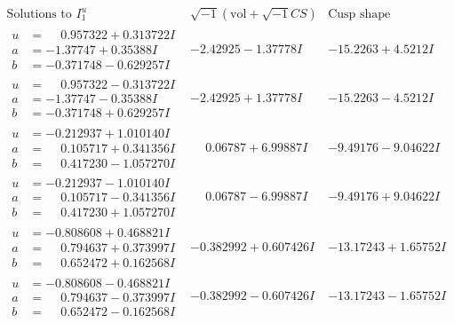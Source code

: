 \documentclass[1p]{elsarticle_modified}
\theoremstyle{definition}
\newcommand{\I}{\sqrt{-1}}
\begin{document}
$$\begin{array}{c|c|c}  
\text{Solutions to }I^u_{1}& \I (\text{vol} + \sqrt{-1}CS) & \text{Cusp shape}\\
 \hline 
\begin{aligned}
u &= \phantom{-}0.957322 + 0.313722 I \\
a &= -1.37747 + 0.35388 I \\
b &= -0.371748 - 0.629257 I\end{aligned}
 & -2.42925 - 1.37778 I & -15.2263 + 4.5212 I \\ \hline\begin{aligned}
u &= \phantom{-}0.957322 - 0.313722 I \\
a &= -1.37747 - 0.35388 I \\
b &= -0.371748 + 0.629257 I\end{aligned}
 & -2.42925 + 1.37778 I & -15.2263 - 4.5212 I \\ \hline\begin{aligned}
u &= -0.212937 + 1.010140 I \\
a &= \phantom{-}0.105717 + 0.341356 I \\
b &= \phantom{-}0.417230 - 1.057270 I\end{aligned}
 & \phantom{-}0.06787 + 6.99887 I & -9.49176 - 9.04622 I \\ \hline\begin{aligned}
u &= -0.212937 - 1.010140 I \\
a &= \phantom{-}0.105717 - 0.341356 I \\
b &= \phantom{-}0.417230 + 1.057270 I\end{aligned}
 & \phantom{-}0.06787 - 6.99887 I & -9.49176 + 9.04622 I \\ \hline\begin{aligned}
u &= -0.808608 + 0.468821 I \\
a &= \phantom{-}0.794637 + 0.373997 I \\
b &= \phantom{-}0.652472 + 0.162568 I\end{aligned}
 & -0.382992 + 0.607426 I & -13.17243 + 1.65752 I \\ \hline\begin{aligned}
u &= -0.808608 - 0.468821 I \\
a &= \phantom{-}0.794637 - 0.373997 I \\
b &= \phantom{-}0.652472 - 0.162568 I\end{aligned}
 & -0.382992 - 0.607426 I & -13.17243 - 1.65752 I \\ \hline\begin{aligned}

\end{aligned}
\end{array}$$
\end{document}
